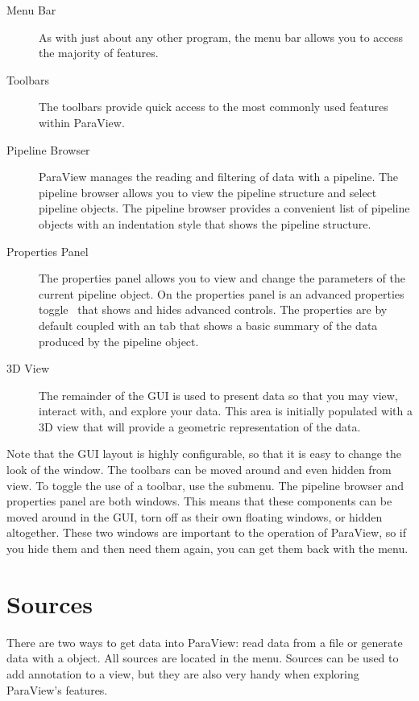 \begin{description}
\item[Menu Bar]  As with just about any other program, the
  menu bar allows you to access the majority of features.
\item[Toolbars]  The toolbars provide quick access to the
  most commonly used features within ParaView.
\item[Pipeline Browser]  ParaView manages the
  reading and filtering of data with a pipeline.  The pipeline browser
  allows you to view the pipeline structure and select pipeline objects.
  The pipeline browser provides a convenient list of pipeline objects with
  an indentation style that shows the pipeline structure.
\item[Properties Panel]  The properties panel
  allows you to view and change the parameters of the current pipeline
  object. On the properties panel is an advanced properties
  toggle~ that shows and hides advanced controls.  The
  properties are by default coupled with an  tab that
  shows a basic summary of the data produced by the pipeline object.
\item[3D View]  The remainder of the GUI is used to present
  data so that you may view, interact with, and explore your data.  This
  area is initially populated with a 3D view that will provide a geometric
  representation of the data.
\end{description}

Note that the GUI layout is highly configurable, so that it is easy to
change the look of the window.  The toolbars can be moved around and even
hidden from view.  To toggle the use of a toolbar, use the  \ra
{} submenu.  The pipeline browser and properties panel are both
 windows.  This means that these components can be moved
around in the GUI, torn off as their own floating windows, or hidden
altogether.  These two windows are important to the operation of ParaView,
so if you hide them and then need them again, you can get them back with
the  menu.


\section{Sources}


There are two ways to get data into ParaView: read data from a file or
generate data with a  object.  All sources are located in
the  menu.  Sources can be used to add annotation to a view,
but they are also very handy when exploring ParaView's features.

